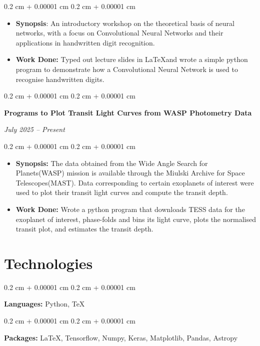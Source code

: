 \documentclass[10pt, letterpaper]{article}
\newenvironment{highlights}{
    \begin{itemize}[
        topsep=0.10 cm,
        parsep=0.10 cm,
        partopsep=0pt,
        itemsep=0pt,
        leftmargin=0.4 cm + 10pt
    ]
}{
    \end{itemize}
} %
\newenvironment{onecolentry}{
    \begin{adjustwidth}{
        0.2 cm + 0.00001 cm
    }{
        0.2 cm + 0.00001 cm
    }
}{
    \end{adjustwidth}
} %
\newenvironment{twocolentry}[2][]{
    \onecolentry
    \def\secondColumn{#2}
    \setcolumnwidth{\fill, 4.5 cm}
    \begin{paracol}{2}
}{
    \switchcolumn \raggedleft \secondColumn
    \end{paracol}
    \endonecolentry
} %
\begin{document}
        \vspace{0.10 cm}
        \begin{onecolentry}
            \begin{highlights}
                \item \textbf{Synopsis}: An introductory workshop on the theoretical basis of neural networks, with a focus on Convolutional Neural Networks and their applications in handwritten digit recognition.
                \item \textbf{Work Done:} Typed out lecture slides in \LaTeX and wrote a simple python program to demonstrate how a Convolutional Neural Network is used to recognise handwritten digits. 
            \end{highlights}
        \end{onecolentry}

         \begin{twocolentry}{
            
            
        \textit{July 2025 – Present}}
            \textbf{Programs to Plot Transit Light Curves from WASP Photometry Data}
            

            
        \end{twocolentry}

        \vspace{0.10 cm}
        \begin{onecolentry}
            \begin{highlights}
                \item \textbf{Synopsis:} The data obtained from the Wide Angle Search for Planets(WASP) mission is available through the Miulski Archive for Space Telescopes(MAST). Data corresponding to certain exoplanets of interest were used to plot their transit light curves and compute the transit depth.
                \item \textbf{Work Done:} Wrote a python program that downloads TESS data for the exoplanet of interest, phase-folds and bins its light curve, plots the normalised transit plot, and estimates the transit depth.
            \end{highlights}
        \end{onecolentry}

         



    
    \section{Technologies}



        
        \begin{onecolentry}
            \textbf{Languages:} Python, \TeX
        \end{onecolentry}

        \vspace{0.2 cm}

        \begin{onecolentry}
            \textbf{Packages:} \LaTeX, Tensorflow, Numpy, Keras, Matplotlib, Pandas, Astropy
        \end{onecolentry}

    




    
\end{document}
